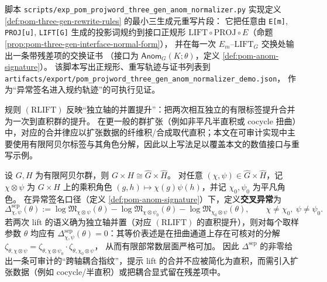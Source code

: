 \begin{remark}\label{rem:pom-projword-threegen-anom-normalizer-demo}
脚本 \texttt{scripts/exp\_pom\_projword\_three\_gen\_anom\_normalizer.py} 实现定义 \ref{def:pom-three-gen-rewrite-rules} 的最小三生成元重写片段：
它把任意由 \texttt{E[m]}, \texttt{PROJ[u]}, \texttt{LIFT[G]} 生成的投影词规约到接口正规形
\(\mathrm{LIFT}\circ\mathrm{PROJ}\circ E\)（命题 \ref{prop:pom-three-gen-interface-normal-form}），
并在每一次 \(E_m\)--\(\mathrm{LIFT}_G\) 交换处输出一条带残差项的交换证书
（接口为 \(\mathsf{Anom}_G(K;\theta)\)，定义 \ref{def:pom-anom-signature}）。
该脚本写出正规形、重写轨迹与证书列表到
\texttt{artifacts/export/pom\_projword\_three\_gen\_anom\_normalizer\_demo.json}，
作为“异常签名进入规约轨迹”的可执行见证。
\end{remark}

\begin{remark}\label{rem:pom-rlift-scope}
规则 \((\mathrm{RLIFT})\) 反映“独立轴的并置提升”：把两次相互独立的有限标签提升合并为一次到直积群的提升。
在更一般的群扩张（例如非平凡半直积或 cocycle 扭曲）中，对应的合并律应以扩张数据的纤维积/合成取代直积；本文在可审计实现中主要使用有限阿贝尔标签与其角色分解，因此以上写法足以覆盖本文的数值接口与重写示例。
\end{remark}

\begin{remark}\label{rem:pom-rlift-cross-anom-test}
设 \(G,H\) 为有限阿贝尔群，则 \(\widehat{G\times H}\cong\widehat G\times\widehat H\)。
对任意 \((\chi,\psi)\in\widehat G\times\widehat H\)，记 \(\chi\otimes\psi\) 为 \(G\times H\) 上的乘积角色
\((g,h)\mapsto \chi(g)\psi(h)\)，并记 \(\chi_0,\psi_0\) 为平凡角色。
在异常签名口径（定义 \ref{def:pom-anom-signature}）下，定义\textbf{交叉异常}为
\[
\Delta^{\mathrm{sep}}_{\chi,\psi}(\theta)
:=
\log\mathfrak{M}_{\chi\otimes\psi}(\theta)
-\log\mathfrak{M}_{\chi\otimes\psi_0}(\theta)
-\log\mathfrak{M}_{\chi_0\otimes\psi}(\theta),
\qquad
\chi\neq\chi_0,\ \psi\neq\psi_0.
\]
若两次 lift 的语义确为独立轴并置（对应 \((\mathrm{RLIFT})\) 的直积提升），则对每个取样参数 \(\theta\) 均应有
\(\Delta^{\mathrm{sep}}_{\chi,\psi}(\theta)=0\)：其等价表述是在扭曲通道上存在可核对的分解
\(\zeta_{\theta,\chi\otimes\psi}=\zeta_{\theta,\chi\otimes\psi_0}\cdot \zeta_{\theta,\chi_0\otimes\psi}\)，
从而有限部常数层面严格可加。
因此 \(\Delta^{\mathrm{sep}}\) 的非零给出一条可审计的“跨轴耦合指纹”，提示 lift 的合并不应被简化为直积，而需引入扩张数据（例如 cocycle/半直积）或把耦合显式留在残差项中。
\end{remark}


